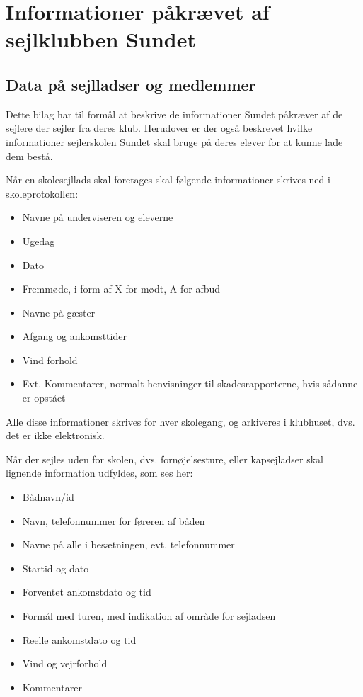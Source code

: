 \chapter{Informationer påkrævet af sejlklubben Sundet}\label{bilag:sundet}

\section{Data på sejlladser og medlemmer}

Dette bilag har til formål at beskrive de informationer Sundet påkræver af de sejlere der sejler fra deres klub. Herudover er der også beskrevet hvilke informationer sejlerskolen Sundet skal bruge på deres elever for at kunne lade dem bestå.

Når en skolesejllads skal foretages skal følgende informationer skrives ned i skoleprotokollen:

\begin{itemize}
	\item Navne på underviseren og eleverne
	\item Ugedag
	\item Dato
	\item Fremmøde, i form af X for mødt, A for afbud
	\item Navne på gæster
	\item Afgang og ankomsttider
	\item Vind forhold
	\item Evt. Kommentarer, normalt henvisninger til skadesrapporterne, hvis sådanne er opstået
\end{itemize}

Alle disse informationer skrives for hver skolegang, og arkiveres i klubhuset, dvs. det er ikke elektronisk.

Når der sejles uden for skolen, dvs. fornøjelsesture, eller kapsejladser skal lignende information udfyldes, som ses her:

\begin{itemize}
	\item Bådnavn/id
	\item Navn, telefonnummer for føreren af båden
	\item Navne på alle i besætningen, evt. telefonnummer
	\item Startid og dato
	\item Forventet ankomstdato og tid
	\item Formål med turen, med indikation af område for sejladsen
	\item Reelle ankomstdato og tid
	\item Vind og vejrforhold
	\item Kommentarer
\end{itemize}

